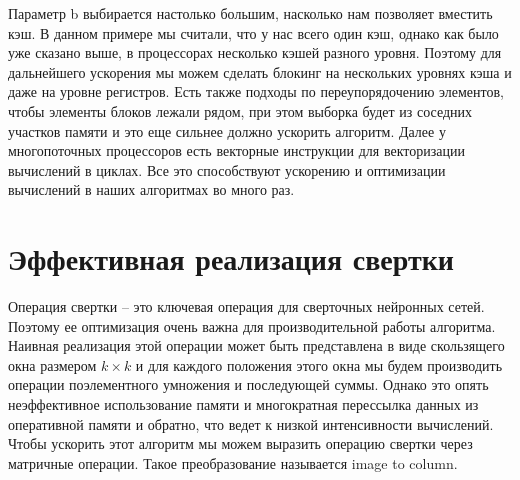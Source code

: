\documentclass[oneside,final,12pt]{extreport}
\begin{document}
Параметр b выбирается настолько большим, насколько нам позволяет вместить кэш. В данном примере мы считали, что у нас всего один кэш, однако как было уже сказано выше, в процессорах несколько кэшей разного уровня. Поэтому для дальнейшего ускорения мы можем сделать блокинг на нескольких уровнях кэша и даже на уровне регистров. Есть также подходы по переупорядочению элементов, чтобы элементы блоков лежали рядом, при этом выборка будет из соседних участков памяти и это еще сильнее должно ускорить алгоритм. Далее у многопоточных процессоров есть векторные инструкции  для векторизации вычислений в циклах.
Все это способствуют ускорению и оптимизации вычислений в наших алгоритмах во много раз.

\section{Эффективная реализация свертки}
Операция свертки – это ключевая операция для сверточных нейронных сетей. Поэтому ее оптимизация очень важна для производительной работы алгоритма. Наивная реализация этой операции может быть представлена в виде скользящего окна размером $k \times k$ и для каждого положения этого окна мы будем производить операции поэлементного умножения и последующей суммы. Однако это опять неэффективное использование памяти и многократная перессылка данных из оперативной памяти и обратно, что ведет к низкой интенсивности вычислений. Чтобы ускорить этот алгоритм мы можем выразить операцию свертки через матричные операции. Такое преобразование называется image to column. 
\end{document}
